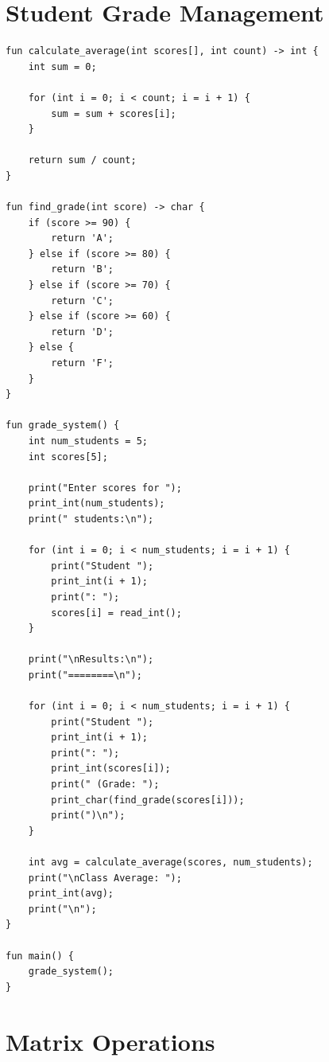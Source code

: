 \documentclass[12pt,a4paper,oneside]{book}
\begin{document}
\section{Student Grade Management}

\begin{lstlisting}[style=algo, caption={Grade Management System}]
fun calculate_average(int scores[], int count) -> int {
    int sum = 0;
    
    for (int i = 0; i < count; i = i + 1) {
        sum = sum + scores[i];
    }
    
    return sum / count;
}

fun find_grade(int score) -> char {
    if (score >= 90) {
        return 'A';
    } else if (score >= 80) {
        return 'B';
    } else if (score >= 70) {
        return 'C';
    } else if (score >= 60) {
        return 'D';
    } else {
        return 'F';
    }
}

fun grade_system() {
    int num_students = 5;
    int scores[5];
    
    print("Enter scores for ");
    print_int(num_students);
    print(" students:\n");
    
    for (int i = 0; i < num_students; i = i + 1) {
        print("Student ");
        print_int(i + 1);
        print(": ");
        scores[i] = read_int();
    }
    
    print("\nResults:\n");
    print("========\n");
    
    for (int i = 0; i < num_students; i = i + 1) {
        print("Student ");
        print_int(i + 1);
        print(": ");
        print_int(scores[i]);
        print(" (Grade: ");
        print_char(find_grade(scores[i]));
        print(")\n");
    }
    
    int avg = calculate_average(scores, num_students);
    print("\nClass Average: ");
    print_int(avg);
    print("\n");
}

fun main() {
    grade_system();
}
\end{lstlisting}

\section{Matrix Operations}
\end{document}
